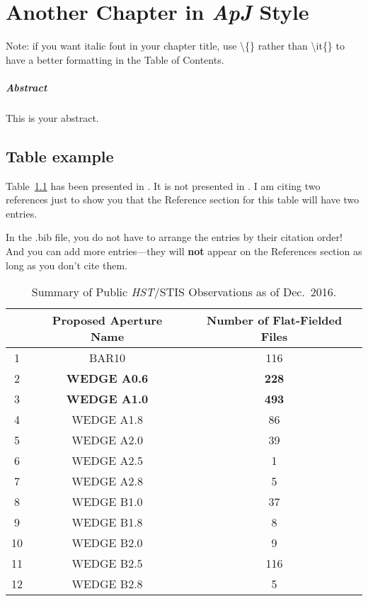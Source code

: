 \chapter{Another Chapter in \textit{ApJ} Style}\label{chapter-apj-dup}
Note: if you want italic font in your chapter title, use \textbackslash\{\} rather than \textbackslash{it}\{\} to have a better formatting in the Table of Contents.
\paragraph*{Abstract} This is your abstract.

\section{Table example}
Table~\ref{tab:stis-obs} has been presented in \citet{ren17}. It is not presented in \citet{ren18}. I am citing two references just to show you that the Reference section for this table will have two entries.

In the .bib file, you do not have to arrange the entries by their citation order! And you can add more entries---they will \textbf{not} appear on the References section as long as you don't cite them.


\begin{table}[htb!]
\centering
\caption[Summary of {\it HST}/STIS coronagraphic imaging observations as of 2016 December.]{Summary of Public {\it HST}/STIS Observations as of Dec.~2016.}
\label{tab:stis-obs}
\begin{tabular}{ccc}\hline\hline
   & Proposed Aperture Name & Number of Flat-Fielded Files \\ \hline
1  & BAR10                  & 116             \\
2  & {\bf WEDGE A0.6}             & {\bf 228}            \\
3  & {\bf WEDGE A1.0}             & {\bf 493}             \\
4  & WEDGE A1.8             & 86              \\
5  & WEDGE A2.0             & 39              \\
6  & WEDGE A2.5             & 1               \\
7  & WEDGE A2.8             & 5               \\
8  & WEDGE B1.0             & 37              \\
9  & WEDGE B1.8             & 8               \\
10 & WEDGE B2.0             & 9               \\
11 & WEDGE B2.5             & 116             \\
12 & WEDGE B2.8             & 5\\ \hline
\end{tabular}
\end{table}
